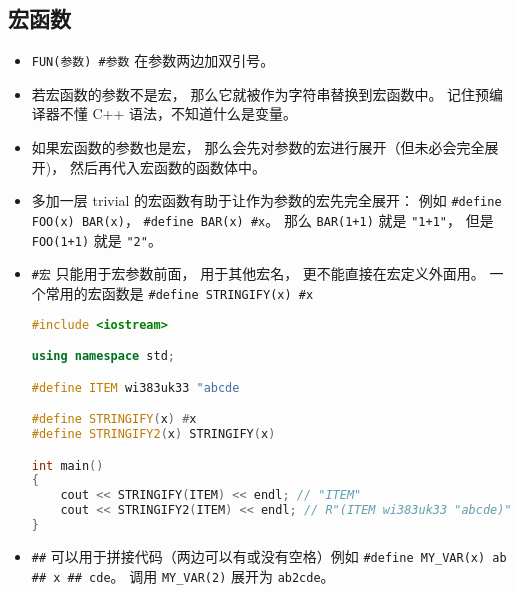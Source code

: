 \subsection{宏函数}
\begin{itemize}
\item \verb|FUN(参数) #参数| 在参数两边加双引号。
\item 若宏函数的参数不是宏， 那么它就被作为字符串替换到宏函数中。 记住预编译器不懂 C++ 语法，不知道什么是变量。
\item 如果宏函数的参数也是宏， 那么会先对参数的宏进行展开（但未必会完全展开)， 然后再代入宏函数的函数体中。
\item 多加一层 trivial 的宏函数有助于让作为参数的宏先完全展开： 例如 \verb|#define FOO(x) BAR(x)|， \verb|#define BAR(x) #x|。 那么 \verb|BAR(1+1)| 就是 \verb|"1+1"|， 但是 \verb|FOO(1+1)| 就是 \verb|"2"|。
\item \verb|#宏| 只能用于宏参数前面， 用于其他宏名， 更不能直接在宏定义外面用。 一个常用的宏函数是 \verb|#define STRINGIFY(x) #x|
\begin{lstlisting}[language=cpp]
#include <iostream>

using namespace std;

#define ITEM wi383uk33 "abcde

#define STRINGIFY(x) #x
#define STRINGIFY2(x) STRINGIFY(x)

int main()
{
	cout << STRINGIFY(ITEM) << endl; // "ITEM"
	cout << STRINGIFY2(ITEM) << endl; // R"(ITEM wi383uk33 "abcde)"
}
\end{lstlisting}
\item \verb|##| 可以用于拼接代码（两边可以有或没有空格）例如 \verb|#define MY_VAR(x) ab ## x ## cde|。 调用 \verb|MY_VAR(2)| 展开为 \verb|ab2cde|。
\end{itemize}
